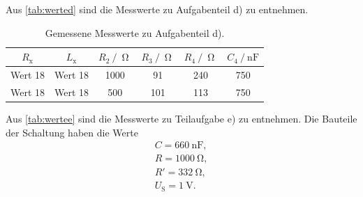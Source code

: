 Aus \autoref{tab:werted} sind die Messwerte zu Aufgabenteil d) zu entnehmen.

\begin{table}[H]
  \centering
  \caption{Gemessene Messwerte zu Aufgabenteil d).}
  \label{tab:werted}
  \begin{tabular}{c c c c c c}
    \toprule
    $R_{\text{x}}$ & $L_{\text{x}}$ & $R_{\text{2}} \:/\: \upOmega$ & $R_{\text{3}} \:/\: \upOmega$ & $R_{\text{4}} \:/\: \upOmega$  & $C_{\text{4}} \:/\: \si{\nano\farad}$ \\
    \midrule
    Wert 18 & Wert 18 & 1000 & 91 & 240 & 750 \\
    Wert 18 & Wert 18 & 500 & 101 & 113 & 750 \\
    \bottomrule
  \end{tabular}
\end{table}


Aus \autoref{tab:wertee} sind die Messwerte zu Teilaufgabe e) zu entnehmen. Die Bauteile der Schaltung haben die Werte
\begin{align*}
  C = \SI{660}{\nano\farad},\\
  R = \SI{1000}{\ohm}, \\
  R' = \SI{332}{\ohm}, \\
  U_{\text{S}} = \SI{1}{\volt}. \\
\end{align*}


